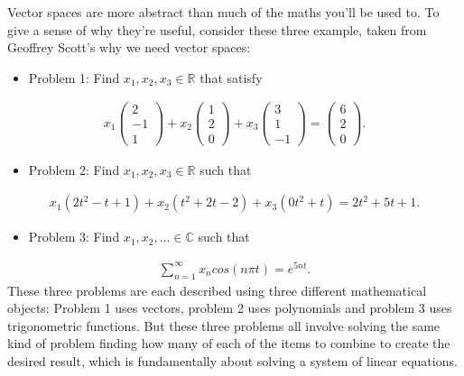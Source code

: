 \documentclass[letterpaper,10pt,english]{jupyterBook}
\begin{document}
\sphinxAtStartPar
Vector spaces are more abstract than much of the maths you’ll be used to. To give a sense of why they’re useful, consider these three example, taken from  Geoffrey Scott’s why we need vector spaces:
\begin{itemize}
\item {} 
\sphinxAtStartPar
Problem 1: Find \(x_1, x_2, x_3 \in \mathbb{R}\) that satisfy

\end{itemize}
\begin{equation*}
\begin{split} x_1 \begin{pmatrix} 2 \\ -1 \\ 1 \end{pmatrix} + x_2 \begin{pmatrix} 1 \\ 2 \\ 0 \end{pmatrix} + x_3 \begin{pmatrix} 3 \\ 1 \\ -1 \end{pmatrix} = \begin{pmatrix} 6 \\ 2 \\ 0 \end{pmatrix}. \end{split}
\end{equation*}\begin{itemize}
\item {} 
\sphinxAtStartPar
Problem 2: Find \(x_1, x_2, x_3 \in \mathbb{R}\) such that

\end{itemize}
\begin{equation*}
\begin{split} x_1 (2t^2 - t + 1) + x_2 (t^2 + 2t -2) + x_3 (0t^2 + t) = 2t^2 + 5t + 1.\end{split}
\end{equation*}\begin{itemize}
\item {} 
\sphinxAtStartPar
Problem 3: Find \(x_1, x_2, \ldots \in \mathbb{C}\) such that

\end{itemize}
\begin{equation*}
\begin{split} \sum_{n=1}^\infty x_n cos(n \pi t) = e^{5nt}. \end{split}
\end{equation*}
\sphinxAtStartPar
These three problems are each described using three different mathematical objects: Problem 1 uses vectors, problem 2 uses polynomials and problem 3 uses trigonometric functions. But these three problems all involve solving the same kind of problem \sphinxhyphen{} finding how many of each of the items to combine to create the desired result, which is fundamentally about solving a system of linear equations.
\end{document}
